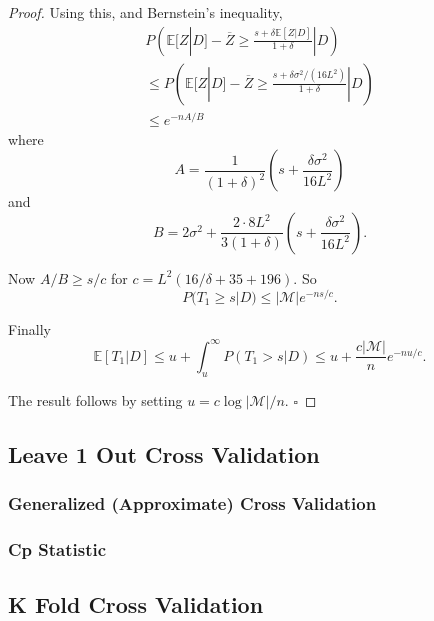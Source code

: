 \begin{proof}
    Using this, and Bernstein's inequality,
    \begin{align}
      P \left( \mathbb{E}[Z|D] - \overline{Z} \geq \frac{s + \delta\mathbb{E}[Z|D]}{1 + \delta} |D \right) \\
      \leq P \left( \mathbb{E}[Z|D] - \overline{Z} \geq \frac{s + \delta\sigma^2/(16L^2)}{1 + \delta} |D \right) \\
      \leq e^{-nA/B}
    \end{align}
    where
    \begin{equation}
      A = \frac{1}{(1 + \delta)^2} \left( s + \frac{\delta\sigma^2}{16L^2} \right)
    \end{equation}
    and
    \begin{equation}
      B = 2\sigma^2 + \frac{2 \cdot 8L^2}{3(1 + \delta)} \left( s + \frac{\delta\sigma^2}{16L^2} \right).
    \end{equation}

    Now $A/B \geq s/c$ for $c = L^2(16/\delta + 35 + 196)$. So
    \begin{equation}
      P(T_1 \geq s|D) \leq |\mathcal{M}| e^{-ns/c}.
    \end{equation}

    Finally
    \begin{equation}
      \mathbb{E}[T_1|D] \leq u + \int_u^{\infty} P(T_1 > s|D) \leq u + \frac{c|\mathcal{M}|}{n} e^{-nu/c}.
    \end{equation}

    The result follows by setting $u = c \log |\mathcal{M}|/n$. $\square$
  \end{proof}

\subsection{Leave 1 Out Cross Validation} 

  \subsubsection{Generalized (Approximate) Cross Validation} 

  \subsubsection{Cp Statistic}

\subsection{K Fold Cross Validation}

